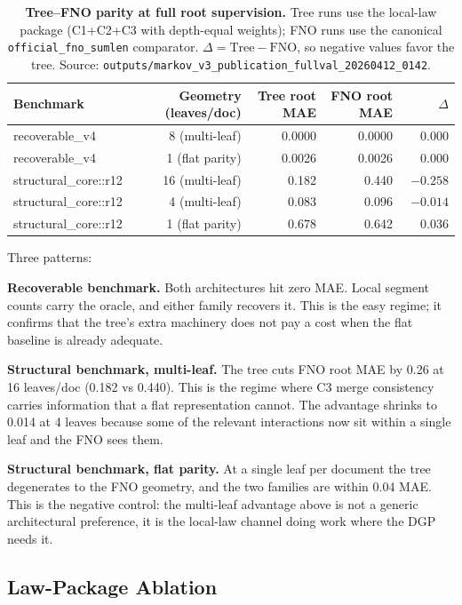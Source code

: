 \begin{table}[t]
\centering
\small
\setlength{\tabcolsep}{6pt}
\begin{tabular}{@{}lrrrr@{}}
\toprule
Benchmark & Geometry (leaves/doc) & Tree root MAE & FNO root MAE & \(\Delta\) \\
\midrule
recoverable\_v4 & 8 (multi-leaf) & 0.0000 & 0.0000 & \(\phantom{-}0.000\) \\
recoverable\_v4 & 1 (flat parity) & 0.0026 & 0.0026 & \(\phantom{-}0.000\) \\
structural\_core::r12 & 16 (multi-leaf) & 0.182 & 0.440 & \(-0.258\) \\
structural\_core::r12 & 4 (multi-leaf) & 0.083 & 0.096 & \(-0.014\) \\
structural\_core::r12 & 1 (flat parity) & 0.678 & 0.642 & \(\phantom{-}0.036\) \\
\bottomrule
\end{tabular}
\caption{\textbf{Tree--FNO parity at full root supervision.} Tree
runs use the local-law package (C1+C2+C3 with depth-equal weights);
FNO runs use the canonical \texttt{official\_fno\_sumlen}
comparator. \(\Delta=\text{Tree}-\text{FNO}\), so negative values
favor the tree. Source:
\texttt{outputs/markov\_v3\_publication\_fullval\_20260412\_0142}.}
\label{tab:v10-markov-parity}
\end{table}

Three patterns:

\textbf{Recoverable benchmark.} Both architectures hit zero MAE.
Local segment counts carry the oracle, and either family recovers
it. This is the easy regime; it confirms that the tree's extra
machinery does not pay a cost when the flat baseline is already
adequate.

\textbf{Structural benchmark, multi-leaf.} The tree cuts FNO root
MAE by 0.26 at 16 leaves/doc (0.182 vs 0.440). This is the regime
where C3 merge consistency carries information that a flat
representation cannot. The advantage shrinks to 0.014 at 4 leaves
because some of the relevant interactions now sit within a single
leaf and the FNO sees them.

\textbf{Structural benchmark, flat parity.} At a single leaf per
document the tree degenerates to the FNO geometry, and the two
families are within 0.04 MAE. This is the negative control: the
multi-leaf advantage above is not a generic architectural
preference, it is the local-law channel doing work where the DGP
needs it.

\subsection{Law-Package Ablation}

